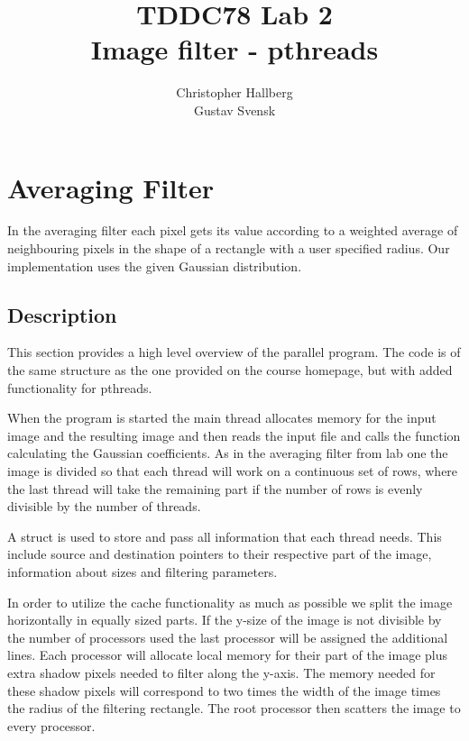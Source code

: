 \documentclass[a4paper, 12pt]{article}
\begin{document}
\title{TDDC78 Lab 2\\
        Image filter - pthreads}
\author{Christopher Hallberg \\
        Gustav Svensk}
\maketitle

\thispagestyle{empty}

\newpage
\setcounter{page}{1}
\tableofcontents
\newpage

\section{Averaging Filter}
In the averaging filter each pixel gets its value according to a weighted average
of neighbouring pixels in the shape of a rectangle with a user specified radius. 
Our implementation uses the given Gaussian distribution.

\subsection{Description}
\label{sec:desc}
This section provides a high level overview of the parallel program. 
The code is of the same structure as the one provided on the course homepage,
but with added functionality for pthreads.

When the program is started the main thread allocates memory for the input image
and the resulting image and then reads the input file and calls the function
calculating the Gaussian coefficients. As in the averaging filter from lab one
the image is divided so that each thread will work on a continuous set of rows,
where the last thread will take the remaining part if the number of rows is
evenly divisible by the number of threads.

A struct is used to store and pass all information that each thread needs. This
include source and destination pointers to their respective part of the image,
information about sizes and filtering parameters.

In order to utilize the cache functionality as much as possible we split the image
horizontally in equally sized parts. If the y-size of the image is not divisible
by the number of processors used the last processor will be assigned the
additional lines. Each processor will allocate local memory for their part of the
image plus extra shadow pixels needed to filter along the y-axis. The memory
needed for these shadow pixels will correspond to two times the width of the
image times the radius of the filtering rectangle. The root processor then 
scatters the image to every processor.  
\end{document}
